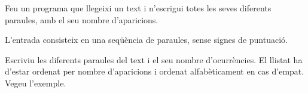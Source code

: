 

\Statement

Feu un programa que llegeixi un text i n'escrigui totes les seves diferents paraules, amb el seu nombre d'aparicions.

\Input

L'entrada consisteix en una seqüència de paraules, sense signes de puntuació.

\Output

Escriviu les diferents paraules del text i el seu nombre d'ocurrències. El llistat ha d'estar ordenat per nombre d'aparicions i ordenat alfabèticament en cas d'empat. Vegeu l'exemple.

\Sample
